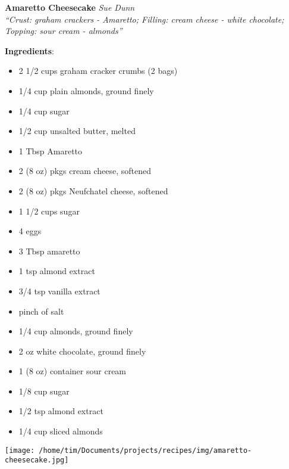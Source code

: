 \documentclass[11pt, twoside, openany]{book}
\begin{document}
\noindent\begin{minipage}[t]{\linewidth}%
{\Large\textbf{Amaretto Cheesecake}} \label{amaretto-cheesecake}\hfill\textit{Sue Dunn}\\
\textit{``Crust: graham crackers - Amaretto; Filling: cream cheese - white chocolate; Topping: sour cream - almonds''}\\
\noindent\begin{minipage}[t]{0.78\linewidth}%
\textbf{Ingredients}:\vspace{-3mm}
\begin{multicols}{2}
\begin{itemize}\setlength\itemsep{-1mm}
\item 2 1/2 cups graham cracker crumbs (2 bags)
\item 1/4 cup plain almonds, ground finely
\item 1/4 cup sugar
\item 1/2 cup unsalted butter, melted
\item 1 Tbsp Amaretto
\item 2 (8 oz) pkgs cream cheese, softened
\item 2 (8 oz) pkgs Neufchatel cheese, softened
\item 1 1/2 cups sugar
\item 4 eggs
\item 3 Tbsp amaretto
\item 1 tsp almond extract
\item 3/4 tsp vanilla extract
\item pinch of salt
\item 1/4 cup almonds, ground finely
\item 2 oz white chocolate, ground finely
\item 1 (8 oz) container sour cream
\item 1/8 cup sugar
\item 1/2 tsp almond extract
\item 1/4 cup sliced almonds
\end{itemize}
\end{multicols}
\end{minipage}
\noindent\begin{minipage}[t]{0.18\linewidth}
\centering \strut\vspace*{-\baselineskip}\newline
\texttt{[image: /home/tim/Documents/projects/recipes/img/amaretto-cheesecake.jpg]}\\
\end{minipage}\vspace{3mm}

\end{minipage}
\end{document}
